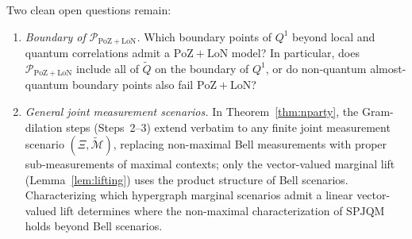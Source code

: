 \documentclass[11pt,a4paper]{article}
\theoremstyle{definition}
\theoremstyle{remark}
\newcommand{\tcM}{\widetilde{\mathcal{M}}}
\newcommand{\SPJQM}{\mathrm{SPJQM}}
\newcommand{\Qone}{Q^{1}}
\newcommand{\tQ}{\widetilde{Q}}
\newcommand{\PoZ}{\mathrm{PoZ}}
\newcommand{\LoN}{\mathrm{LoN}}
\newcommand{\PPoZ}{\mathcal{P}_{\PoZ+\LoN}}
\begin{document}
Two clean open questions remain:
\begin{enumerate}[leftmargin=*,nosep]
\item \emph{Boundary of $\PPoZ$.} Which boundary points of $\Qone$ beyond local and quantum correlations admit a $\PoZ+\LoN$ model? In particular, does $\PPoZ$ include all of $\tQ$ on the boundary of $\Qone$, or do non-quantum almost-quantum boundary points also fail $\PoZ+\LoN$?
\item \emph{General joint measurement scenarios.} In Theorem~\ref{thm:nparty}, the Gram-dilation steps (Steps~2--3) extend verbatim to any finite joint measurement scenario $(\Xi, \tcM)$, replacing non-maximal Bell measurements with proper sub-measurements of maximal contexts; only the vector-valued marginal lift (Lemma~\ref{lem:lifting}) uses the product structure of Bell scenarios. Characterizing which hypergraph marginal scenarios admit a linear vector-valued lift determines where the non-maximal characterization of $\SPJQM$ holds beyond Bell scenarios.
\end{enumerate}
\end{document}
